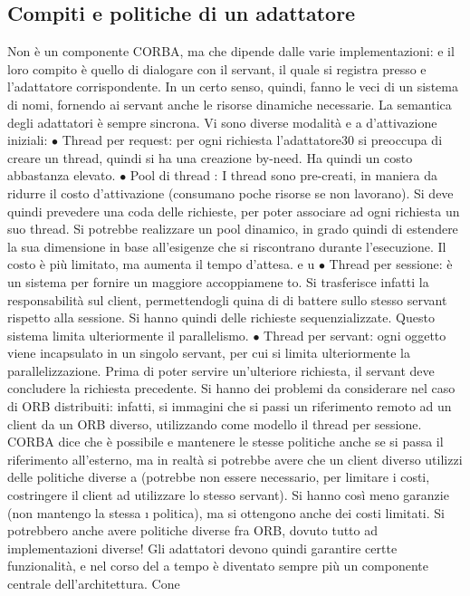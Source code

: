 \documentclass[a4paper,12pt]{article}
\begin{document}
\subsection{Compiti e politiche di un adattatore}
Non è un componente CORBA, ma che dipende dalle varie implementazioni:
e
il loro compito è quello di dialogare con il servant, il quale si registra presso
e
l'adattatore corrispondente. In un certo senso, quindi, fanno le veci di un sistema
di nomi, fornendo ai servant anche le risorse dinamiche necessarie.
La semantica degli adattatori è sempre sincrona. Vi sono diverse modalità
e
a
d'attivazione iniziali:
$\bullet$ Thread per request: per ogni richiesta l'adattatore30 si preoccupa di creare
un thread, quindi si ha una creazione by-need. Ha quindi un costo abbastanza elevato.
$\bullet$ Pool di thread : I thread sono pre-creati, in maniera da ridurre il costo
d'attivazione (consumano poche risorse se non lavorano). Si deve quindi
prevedere una coda delle richieste, per poter associare ad ogni richiesta un
suo thread.
Si potrebbe realizzare un pool dinamico, in grado quindi di estendere la
sua dimensione in base all'esigenze che si riscontrano durante l'esecuzione.
Il costo è più limitato, ma aumenta il tempo d'attesa.
e u
$\bullet$ Thread per sessione: è un sistema per fornire un maggiore accoppiamene
to. Si trasferisce infatti la responsabilità sul client, permettendogli quina
di di battere sullo stesso servant rispetto alla sessione. Si hanno quindi delle richieste sequenzializzate. Questo
sistema limita ulteriormente il
parallelismo.
$\bullet$ Thread per servant: ogni oggetto viene incapsulato in un singolo servant,
per cui si limita ulteriormente la parallelizzazione. Prima di poter servire
un'ulteriore richiesta, il servant deve concludere la richiesta precedente.
Si hanno dei problemi da considerare nel caso di ORB distribuiti: infatti, si
immagini che si passi un riferimento remoto ad un client da un ORB diverso,
utilizzando come modello il thread per sessione. CORBA dice che è possibile
e
mantenere le stesse politiche anche se si passa il riferimento all'esterno, ma
in realtà si potrebbe avere che un client diverso utilizzi delle politiche diverse
a
(potrebbe non essere necessario, per limitare i costi, costringere il client ad utilizzare lo stesso servant). Si hanno
così meno garanzie (non mantengo la stessa
\i{}
politica), ma si ottengono anche dei costi limitati. Si potrebbero anche avere
politiche diverse fra ORB, dovuto tutto ad implementazioni diverse!
Gli adattatori devono quindi garantire certte funzionalità, e nel corso del
a
tempo è diventato sempre più un componente centrale dell'architettura. Cone
\end{document}
